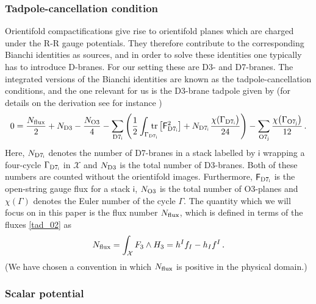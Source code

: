 \documentclass[12pt,a4paper]{article}
\newcommand{\eq}[1]{\begin{equation}
                     \begin{split} #1 \end{split}
                     \end{equation}}
\newcommand{\op}{\hspace{1pt}}
\numberwithin{equation}{section}
\begin{document}

\subsubsection*{Tadpole-cancellation condition}


Orientifold compactifications give rise to orientifold planes which are charged under the R-R gauge potentials.
They therefore contribute to the corresponding Bianchi identities as sources, and in order to solve these identities 
one typically has to introduce D-branes. For our setting these are  D3- and D7-branes. 
The integrated versions of the Bianchi identities are known as the tadpole-cancellation 
conditions, and the one relevant for us is the D3-brane tadpole given by (for  details 
on the derivation see for instance \cite{Plauschinn:2008yd})
\eq{
\label{tadpole_d3}
0=\frac{N_{\rm flux}}{2}  +  N_{{\rm D}3}  -  \frac{N_{{\rm O}3}}{4} 
  -\sum_{{\rm D}7_{\mathsf i}}\left( \frac{1}{2}\int_{\Gamma_{{\rm D}7_{\mathsf i}}}
  \hspace{-10pt}
    \mbox{tr}\left[ \mathsf F^2_{{\rm D}7_{\mathsf i}}\right] 
  + N_{{\rm D}7_{\mathsf i}}\op\frac{\chi( \Gamma_{{\rm D}7_{\mathsf i}}\bigr)}{24} 
  \right)
  -\sum_{{\rm O}7_{\mathsf j}} \frac{\chi\bigl( \Gamma_{{\rm O}7_{\mathsf j}}\bigr)}{12} \,.
}
Here,  $N_{{\rm D}7_{\mathsf i}}$ denotes the number of D7-branes in a stack labelled by $\mathsf i$
wrapping a four-cycle $\Gamma_{{\rm D}7_{\mathsf i}}$ in $\mathcal X$
and $N_{{\rm D}3}$ is the total number of D3-branes. Both of these numbers are counted 
without the orientifold images.
Furthermore, $\mathsf F_{{\rm D}7_{\mathsf i}}$ is the open-string gauge flux for a stack $\mathsf i$, 
$N_{{\rm O}3}$ is the total number of O3-planes and $\chi(\Gamma)$ denotes 
the Euler number of the cycle $\Gamma$.
The quantity which we will focus on in this paper is the flux number $N_{\rm flux}$, 
which is defined in terms of the fluxes \eqref{tad_02} as
\eq{
  \label{tad_03}
  N_{\rm flux} = \int_{\mathcal X} F_3 \wedge H_3 =  h^If_I - h_I f^I  \,.
}
(We have
chosen a convention in which  $N_{\rm flux}$ is positive in the physical domain.)



\subsubsection*{Scalar potential}
\end{document}

